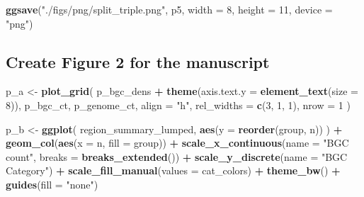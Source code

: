 \documentclass[
]{article}
\newenvironment{Shaded}{\begin{snugshade}}{\end{snugshade}}
\newcommand{\AttributeTok}[1]{\textcolor[rgb]{0.13,0.29,0.53}{#1}}
\newcommand{\DecValTok}[1]{\textcolor[rgb]{0.00,0.00,0.81}{#1}}
\newcommand{\FunctionTok}[1]{\textcolor[rgb]{0.13,0.29,0.53}{\textbf{#1}}}
\newcommand{\NormalTok}[1]{#1}
\newcommand{\OtherTok}[1]{\textcolor[rgb]{0.56,0.35,0.01}{#1}}
\newcommand{\SpecialCharTok}[1]{\textcolor[rgb]{0.81,0.36,0.00}{\textbf{#1}}}
\newcommand{\StringTok}[1]{\textcolor[rgb]{0.31,0.60,0.02}{#1}}
\begin{document}
\begin{Shaded}
\begin{Highlighting}[]
\FunctionTok{ggsave}\NormalTok{(}\StringTok{"./figs/png/split\_triple.png"}\NormalTok{, p5, }\AttributeTok{width =} \DecValTok{8}\NormalTok{, }\AttributeTok{height =} \DecValTok{11}\NormalTok{, }\AttributeTok{device =} \StringTok{"png"}\NormalTok{)}
\end{Highlighting}
\end{Shaded}

\hypertarget{create-figure-2-for-the-manuscript}{%
\subsection{Create Figure 2 for the
manuscript}\label{create-figure-2-for-the-manuscript}}

\begin{Shaded}
\begin{Highlighting}[]
\NormalTok{p\_a }\OtherTok{\textless{}{-}} \FunctionTok{plot\_grid}\NormalTok{(}
\NormalTok{    p\_bgc\_dens }\SpecialCharTok{+} \FunctionTok{theme}\NormalTok{(}\AttributeTok{axis.text.y =} \FunctionTok{element\_text}\NormalTok{(}\AttributeTok{size =} \DecValTok{8}\NormalTok{)), }
\NormalTok{    p\_bgc\_ct, }
\NormalTok{    p\_genome\_ct, }
    \AttributeTok{align =} \StringTok{"h"}\NormalTok{, }
    \AttributeTok{rel\_widths =} \FunctionTok{c}\NormalTok{(}\DecValTok{3}\NormalTok{, }\DecValTok{1}\NormalTok{, }\DecValTok{1}\NormalTok{), }
    \AttributeTok{nrow =} \DecValTok{1}
\NormalTok{    )}

\NormalTok{p\_b }\OtherTok{\textless{}{-}} \FunctionTok{ggplot}\NormalTok{(}
\NormalTok{    region\_summary\_lumped,}
    \FunctionTok{aes}\NormalTok{(}\AttributeTok{y =} \FunctionTok{reorder}\NormalTok{(group, n))}
\NormalTok{) }\SpecialCharTok{+}
  \FunctionTok{geom\_col}\NormalTok{(}\FunctionTok{aes}\NormalTok{(}\AttributeTok{x =}\NormalTok{ n, }\AttributeTok{fill =}\NormalTok{ group)) }\SpecialCharTok{+}
  \FunctionTok{scale\_x\_continuous}\NormalTok{(}\AttributeTok{name =} \StringTok{"BGC count"}\NormalTok{, }\AttributeTok{breaks =} \FunctionTok{breaks\_extended}\NormalTok{()) }\SpecialCharTok{+}
  \FunctionTok{scale\_y\_discrete}\NormalTok{(}\AttributeTok{name =} \StringTok{"BGC Category"}\NormalTok{) }\SpecialCharTok{+}
  \FunctionTok{scale\_fill\_manual}\NormalTok{(}\AttributeTok{values =}\NormalTok{ cat\_colors) }\SpecialCharTok{+}
  \FunctionTok{theme\_bw}\NormalTok{() }\SpecialCharTok{+}
  \FunctionTok{guides}\NormalTok{(}\AttributeTok{fill =} \StringTok{"none"}\NormalTok{)}


\end{Highlighting}
\end{Shaded}
\end{document}
